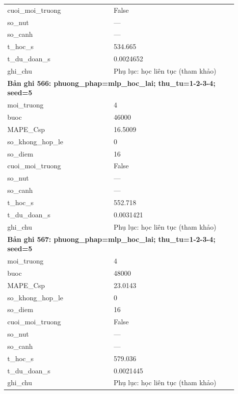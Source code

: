 \begin{longtable}{p{0.43\linewidth}p{0.50\linewidth}}
cuoi\_\allowbreak moi\_\allowbreak truong & False \\
so\_\allowbreak nut & — \\
so\_\allowbreak canh & — \\
t\_\allowbreak hoc\_\allowbreak s & 534.665 \\
t\_\allowbreak du\_\allowbreak doan\_\allowbreak s & 0.0024652 \\
ghi\_\allowbreak chu & Phụ lục: học liên tục (tham khảo) \\
\midrule
\multicolumn{2}{p{0.95\linewidth}}{\textbf{Bản ghi 566: phuong\_phap=mlp\_hoc\_lai; thu\_tu=1-2-3-4; seed=5}} \\
moi\_\allowbreak truong & 4 \\
buoc & 46000 \\
MAPE\_\allowbreak Csp & 16.5009 \\
so\_\allowbreak khong\_\allowbreak hop\_\allowbreak le & 0 \\
so\_\allowbreak diem & 16 \\
cuoi\_\allowbreak moi\_\allowbreak truong & False \\
so\_\allowbreak nut & — \\
so\_\allowbreak canh & — \\
t\_\allowbreak hoc\_\allowbreak s & 552.718 \\
t\_\allowbreak du\_\allowbreak doan\_\allowbreak s & 0.0031421 \\
ghi\_\allowbreak chu & Phụ lục: học liên tục (tham khảo) \\
\midrule
\multicolumn{2}{p{0.95\linewidth}}{\textbf{Bản ghi 567: phuong\_phap=mlp\_hoc\_lai; thu\_tu=1-2-3-4; seed=5}} \\
moi\_\allowbreak truong & 4 \\
buoc & 48000 \\
MAPE\_\allowbreak Csp & 23.0143 \\
so\_\allowbreak khong\_\allowbreak hop\_\allowbreak le & 0 \\
so\_\allowbreak diem & 16 \\
cuoi\_\allowbreak moi\_\allowbreak truong & False \\
so\_\allowbreak nut & — \\
so\_\allowbreak canh & — \\
t\_\allowbreak hoc\_\allowbreak s & 579.036 \\
t\_\allowbreak du\_\allowbreak doan\_\allowbreak s & 0.0021445 \\
ghi\_\allowbreak chu & Phụ lục: học liên tục (tham khảo) \\

\end{longtable}
